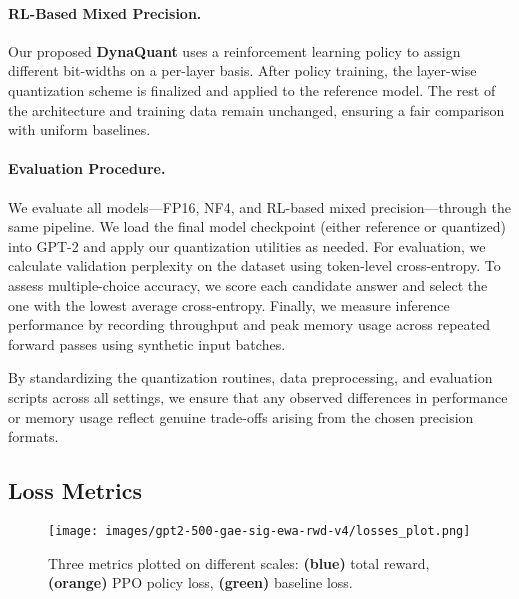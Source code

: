 \documentclass{article}
\begin{document}
	\paragraph{RL-Based Mixed Precision.}
	Our proposed \textbf{DynaQuant} uses a reinforcement learning policy to assign different bit-widths on a per-layer basis. After policy training, the layer-wise quantization scheme is finalized and applied to the reference model. The rest of the architecture and training data remain unchanged, ensuring a fair comparison with uniform baselines.
	
	\paragraph{Evaluation Procedure.}
	We evaluate all models---FP16, NF4, and RL-based mixed precision---through the same pipeline. We load the final model checkpoint (either reference or quantized) into GPT-2 and apply our quantization utilities as needed. For evaluation, we calculate validation perplexity on the dataset using token-level cross-entropy. To assess multiple-choice accuracy, we score each candidate answer and select the one with the lowest average cross-entropy. Finally, we measure inference performance by recording throughput and peak memory usage across repeated forward passes using synthetic input batches.
	
	By standardizing the quantization routines, data preprocessing, and evaluation scripts across all settings, we ensure that any observed differences in performance or memory usage reflect genuine trade-offs arising from the chosen precision formats.
	
	\subsection{Loss Metrics}

	\begin{figure}[ht]
		\centering
		\texttt{[image: images/gpt2-500-gae-sig-ewa-rwd-v4/losses\_plot.png]}
		\vspace{-1em}
		\caption{\small
			Three metrics plotted on different scales:
			\textbf{(blue)} total reward,
			\textbf{(orange)} PPO policy loss,
			\textbf{(green)} baseline loss.}
		\label{fig:loss_curves}
		\vspace{-0.2em}
	\end{figure}
	
\end{document}
